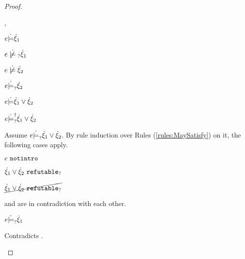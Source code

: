 \begin{proof}
\begin{byCases}
\begin{byCases}
    \item[\csatisfy{e}{\hxi_1},\cmaysatisfy{e}{\hxi_2}]
        \begin{pfsteps*}
        \item $e \dot{\models} \dot{\xi}_1$  
        \item $\cnotmaysatisfy{e}{\hxi_1}$  
        \item $\cnotsatisfy{e}{\hxi_2}$  
        \item $e \dot{\models}_{?} \dot{\xi}_2$  
        \item $e \dot{\models} \dot{\xi}_1 \vee \dot{\xi}_2$  
        \item $e \dot{\models}_{?}^{\dag} \dot{\xi}_1 \vee \dot{\xi}_2$ 
        \end{pfsteps*}
        Assume $e \dot{\models}_{?} \dot{\xi}_1 \vee \dot{\xi}_2$. By rule induction over Rules (\ref{rules:MaySatisfy}) on it, the following cases apply.
        \begin{byCases}
        \item[\text{(\ref{rule:CMSNotIntro})}]
            \begin{pfsteps*}
            \item $e ~\mathtt{notintro}$  
            \item $\dot{\xi}_1 \vee \dot{\xi}_2 ~\mathtt{refutable}_?$  
            \item $\cancel{\dot{\xi}_1 \vee \dot{\xi}_2 ~\mathtt{refutable}_?}$  
            \end{pfsteps*}
             and  are in contradiction with each other.
        \item[\text{(\ref{rule:CMSOr1})}]
            \begin{pfsteps*}
            \item $e \dot{\models}_{?} \dot{\xi}_1$ 
            \end{pfsteps*}
            Contradicts .
        \item[\text{(\ref{rule:CMSOr2})}]
            \begin{pfsteps*}

\end{pfsteps*}
\end{byCases}
\end{byCases}
\end{byCases}
\end{proof}

